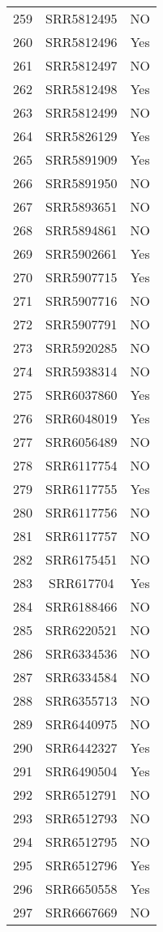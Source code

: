 \begin{longtable}{ccc}
  259 & SRR5812495 & NO \\ 
  260 & SRR5812496 & Yes \\ 
  261 & SRR5812497 & NO \\ 
  262 & SRR5812498 & Yes \\ 
  263 & SRR5812499 & NO \\ 
  264 & SRR5826129 & Yes \\ 
  265 & SRR5891909 & Yes \\ 
  266 & SRR5891950 & NO \\ 
  267 & SRR5893651 & NO \\ 
  268 & SRR5894861 & NO \\ 
  269 & SRR5902661 & Yes \\ 
  270 & SRR5907715 & Yes \\ 
  271 & SRR5907716 & NO \\ 
  272 & SRR5907791 & NO \\ 
  273 & SRR5920285 & NO \\ 
  274 & SRR5938314 & NO \\ 
  275 & SRR6037860 & Yes \\ 
  276 & SRR6048019 & Yes \\ 
  277 & SRR6056489 & NO \\ 
  278 & SRR6117754 & NO \\ 
  279 & SRR6117755 & Yes \\ 
  280 & SRR6117756 & NO \\ 
  281 & SRR6117757 & NO \\ 
  282 & SRR6175451 & NO \\ 
  283 & SRR617704 & Yes \\ 
  284 & SRR6188466 & NO \\ 
  285 & SRR6220521 & NO \\ 
  286 & SRR6334536 & NO \\ 
  287 & SRR6334584 & NO \\ 
  288 & SRR6355713 & NO \\ 
  289 & SRR6440975 & NO \\ 
  290 & SRR6442327 & Yes \\ 
  291 & SRR6490504 & Yes \\ 
  292 & SRR6512791 & NO \\ 
  293 & SRR6512793 & NO \\ 
  294 & SRR6512795 & NO \\ 
  295 & SRR6512796 & Yes \\ 
  296 & SRR6650558 & Yes \\ 
  297 & SRR6667669 & NO \\ 

\end{longtable}
